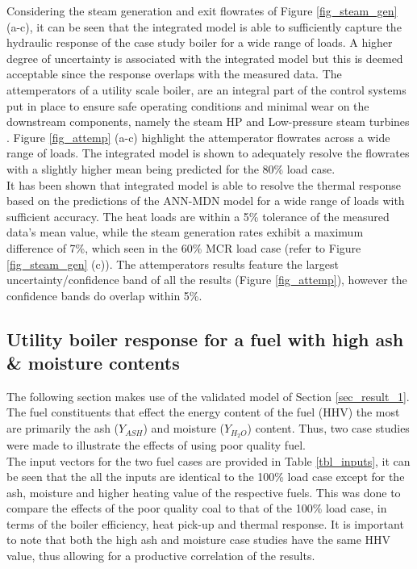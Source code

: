 \documentclass[a4paper,fleqn]{cas-dc}
\begin{document}
Considering the steam generation and exit flowrates of Figure \ref{fig_steam_gen} (a-c), it can be seen that the integrated model is able to sufficiently capture the hydraulic response of the case study boiler for a wide range of loads. A higher degree of uncertainty is associated with the integrated model but this is deemed acceptable since the response overlaps with the measured data. The attemperators of a utility scale boiler, are an integral part of the control systems put in place to ensure safe operating conditions and minimal wear on the downstream components, namely the steam HP and Low-pressure steam turbines \cite{Kakac1991}. Figure  \ref{fig_attemp} (a-c) highlight the attemperator flowrates across a wide range of loads. The integrated model is shown to adequately resolve the flowrates with a slightly higher mean being predicted for the 80\% load case.\\

It has been shown that integrated model is able to resolve the thermal response based on the predictions of the ANN-MDN model for a wide range of loads with sufficient accuracy. The heat loads are within a 5\% tolerance of the measured data's mean value, while the steam generation rates exhibit a maximum difference of 7\%, which seen in the 60\% MCR load case (refer to Figure \ref{fig_steam_gen} (c)). The attemperators results feature the largest uncertainty/confidence band of all the results (Figure \ref{fig_attemp}), however the confidence bands do overlap within 5\%. 
\subsection{Utility boiler response for a fuel with high ash \& moisture contents}
The following section makes use of the validated model of Section \ref{sec_result_1}. The fuel constituents that effect the energy content of the fuel (HHV) the most are primarily the ash ($Y_{ASH}$) and moisture ($Y_{H_{2}O}$) content. Thus, two case studies were made to illustrate the effects of using poor quality fuel.\\

The input vectors for the two fuel cases are provided in Table \ref{tbl_inputs}, it can be seen that the all the inputs are identical to the 100\% load case except for the ash, moisture and higher heating value of the respective fuels. This was done to compare the effects of the poor quality coal to that of the 100\% load case, in terms of the boiler efficiency, heat pick-up and thermal response. It is important to note that both the high ash and moisture case studies have the same HHV value, thus allowing for a productive correlation of the results.\\
\end{document}
